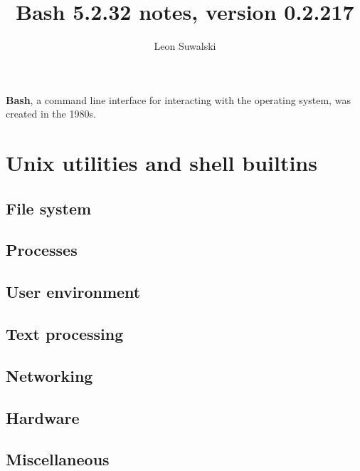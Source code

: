 \documentclass{charun}
\title{Bash 5.2.32 notes, version 0.2.217}
\author{Leon Suwalski}
\begin{document}
\begin{multicols*}{3}
\maketitle
\raggedright

\textbf{Bash}, a command line interface for interacting with the operating system, was created in the 1980s.










\newpage
\section{Unix utilities and shell builtins}
\subsection{File system}


\subsection{Processes}


\subsection{User environment}


\subsection{Text processing}


\subsection{Networking}


\subsection{Hardware}


\subsection{Miscellaneous}


\end{multicols*}
\end{document}
